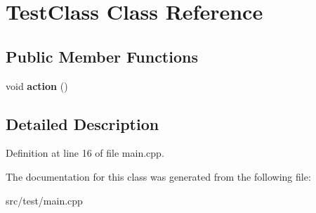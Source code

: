 \hypertarget{class_test_class}{\section{\-Test\-Class \-Class \-Reference}
\label{class_test_class}
}
\subsection*{\-Public \-Member \-Functions}
\begin{DoxyCompactItemize}
\item 
\hypertarget{class_test_class_ab7a8a902ef8358575c0143e0bc27dbcf}{void {\bfseries action} ()}\label{class_test_class_ab7a8a902ef8358575c0143e0bc27dbcf}

\end{DoxyCompactItemize}


\subsection{\-Detailed \-Description}


\-Definition at line 16 of file main.\-cpp.



\-The documentation for this class was generated from the following file\-:\begin{DoxyCompactItemize}
\item 
src/test/main.\-cpp\end{DoxyCompactItemize}
